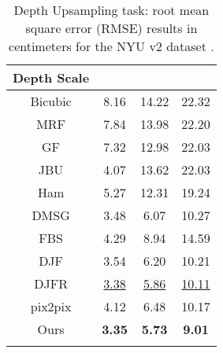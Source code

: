 \documentclass[10pt,twocolumn,letterpaper]{article}
\newlength\tabmargin
\begin{document}
\begin{table}[t]\setlength{\tabcolsep}{10pt}
	\centering\footnotesize
	\caption{Depth Upsampling task: root mean square error (RMSE) results in centimeters for the NYU v2 dataset \cite{NYUdataset}.}
	\begin{tabular}{cccc}
		\toprule
		Depth Scale &   &  &  \\
		\midrule
		Bicubic& 8.16 & 14.22 & 22.32 \\
		MRF \cite{diebel2006application}& 7.84 & 13.98 & 22.20\\
		GF \cite{he2013guided}& 7.32 & 12.98 & 22.03 \\
		JBU \cite{kopf2007joint}& 4.07 & 13.62 & 22.03 \\
		Ham \cite{ham2015robust}& 5.27 & 12.31 & 19.24 \\
		DMSG \cite{hui2016depth}& 3.48 & 6.07 & 10.27 \\
		FBS \cite{barron2016fast}& 4.29 & 8.94 & 14.59 \\
		DJF \cite{li2016deep} & 3.54 & 6.20 & 10.21 \\
        DJFR \cite{li2017joint}& \underline{3.38} & \underline{5.86} & \underline{10.11} \\
        \midrule
        pix2pix \cite{isola2017image}   & 4.12 & 6.48 & 10.17 \\
        Ours &  \textbf{3.35} & \textbf{5.73} & \textbf{9.01}\\
        \bottomrule
		\vspace{\tabmargin}
		\label{tab:depth}
	\end{tabular}
\end{table}
\end{document}

